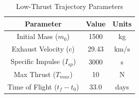 \documentclass[letterpaper, submit]{AAS}			%
\begin{document}
%
\begin{table}[hbt!]
	\centering
	\caption{Low-Thrust Trajectory Parameters}
	\label{tab:traj_params}
	\begin{tabular}{ccc}
		\hline
		\hline
		Parameter             		 & Value        & Units         \\ 
		\hline
		Initial Mass ($m_0$) 		 & 1500 		& kg            \\
		Exhaust Velocity (c) 		 & 29.43        & km/$\text{s}$  \\
		Specific Impulse ($I_{sp}$)  & 3000  		& s             \\
		Max Thrust ($T_{max}$)       & 10  		 	& N             \\
		Time of Flight ($t_f-t_0$)   & 33.0      	& days          \\
		\hline \hline
	\end{tabular}
\end{table}
\end{document}

